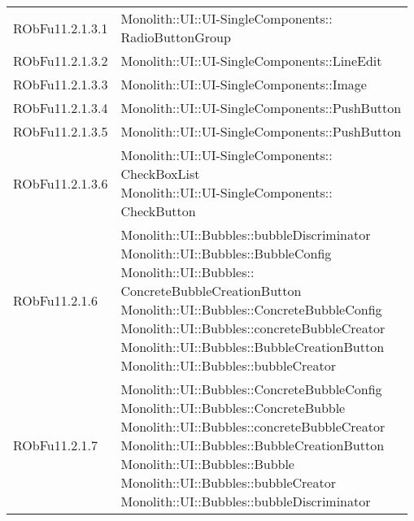 \begin{center}
\begin{longtable}{|
*{1}{>{\centering\arraybackslash}m{2.5cm}|}
*{1}{>{\centering\arraybackslash}m{7.5cm}|}}
{\\}\\\hline
RObFu11.2.1.3.1 & \makecell[l]{Monolith::UI::UI-SingleComponents:: \\ \hfill RadioButtonGroup
\\}\\\hline
RObFu11.2.1.3.2 & \makecell[l]{Monolith::UI::UI-SingleComponents::LineEdit
\\}\\\hline
RObFu11.2.1.3.3 & \makecell[l]{Monolith::UI::UI-SingleComponents::Image
\\}\\\hline
RObFu11.2.1.3.4 & \makecell[l]{Monolith::UI::UI-SingleComponents::PushButton
\\}\\\hline
RObFu11.2.1.3.5 & \makecell[l]{Monolith::UI::UI-SingleComponents::PushButton
\\}\\\hline
RObFu11.2.1.3.6 & \makecell[l]{Monolith::UI::UI-SingleComponents:: \\ \hfill CheckBoxList
\\Monolith::UI::UI-SingleComponents:: \\ \hfill CheckButton
\\}\\\hline
RObFu11.2.1.6 & \makecell[l]{Monolith::UI::Bubbles::bubbleDiscriminator
\\Monolith::UI::Bubbles::BubbleConfig
\\Monolith::UI::Bubbles:: \\ \hfill ConcreteBubbleCreationButton
\\Monolith::UI::Bubbles::ConcreteBubbleConfig
\\Monolith::UI::Bubbles::concreteBubbleCreator
\\Monolith::UI::Bubbles::BubbleCreationButton
\\Monolith::UI::Bubbles::bubbleCreator
\\}\\\hline
RObFu11.2.1.7 & \makecell[l]{Monolith::UI::Bubbles::ConcreteBubbleConfig
\\Monolith::UI::Bubbles::ConcreteBubble
\\Monolith::UI::Bubbles::concreteBubbleCreator
\\Monolith::UI::Bubbles::BubbleCreationButton
\\Monolith::UI::Bubbles::Bubble
\\Monolith::UI::Bubbles::bubbleCreator
\\Monolith::UI::Bubbles::bubbleDiscriminator
}
\end{longtable}
\end{center}
